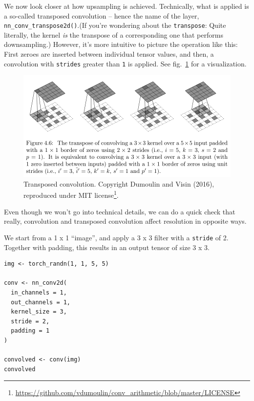 \documentclass[
  letterpaper,
]{krantz}
\DeclareRobustCommand{\href}[2]{#2\footnote{\url{#1}}}
\begin{document}
We now look closer at how upsampling is achieved. Technically, what is
applied is a so-called transposed convolution -- hence the name of the
layer,
\texttt{nn\_conv\_transpose2d()}.(If
you're wondering about the \texttt{transpose}: Quite literally, the
kernel \emph{is} the transpose of a corresponding one that performs
downsampling.) However, it's more intuitive to picture the operation
like this: First zeroes are inserted between individual tensor values,
and then, a convolution with \texttt{strides} greater than \texttt{1} is
applied. See fig.~\ref{fig-segmentation-conv-arithmetic-transposed} for
a visualization.

\begin{figure}[H]

{\centering \includegraphics{images/segmentation-conv-arithmetic-transposed.png}

}

\caption{\label{fig-segmentation-conv-arithmetic-transposed}Transposed
convolution. Copyright Dumoulin and Visin (2016), reproduced under
\href{https://github.com/vdumoulin/conv_arithmetic/blob/master/LICENSE}{MIT
license}.}

\end{figure}

Even though we won't go into technical details, we can do a quick check
that really, convolution and transposed convolution affect resolution in
opposite ways.

We start from a 1 x 1 ``image'', and apply a 3 x 3 filter with a
\texttt{stride} of 2. Together with padding, this results in an output
tensor of size 3 x 3.

\begin{verbatim}
img <- torch_randn(1, 1, 5, 5)

conv <- nn_conv2d(
  in_channels = 1,
  out_channels = 1,
  kernel_size = 3,
  stride = 2,
  padding = 1
)

convolved <- conv(img)
convolved
\end{verbatim}
\end{document}

